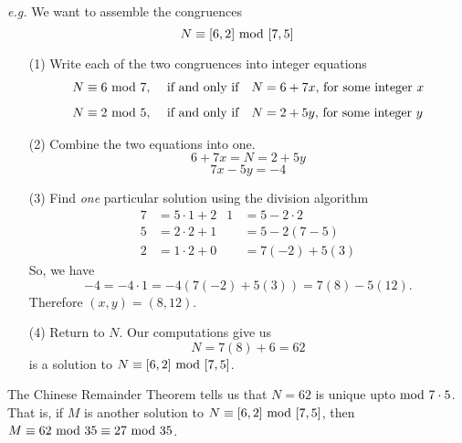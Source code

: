 \emph{e.g.} We want to assemble the congruences
\[N \equiv [6,2]\text{ mod }{[7,5]}\]
\begin{itemize}[leftmargin=2em]
\item[(1)] Write each of the two congruences into integer equations
\begin{align*}
N \equiv 6\text{ mod }{7},\quad &\text{ if and only if}\quad N = 6 + 7x \text{,\ for some integer $x$}\\[0.5em]
N \equiv 2\text{ mod }{5},\quad &\text{ if and only if}\quad N = 2 + 5y \text{,\ for some integer $y$}
\end{align*}
\item[(2)] Combine the two equations into one.
\[6 + 7x = N = 2 + 5y\]
\[7x - 5y = -4\]
\item[(3)] Find \emph{one} particular solution using the division algorithm
\begin{align*}
7 &= 5\cdot 1 + 2 & 1 &= 5 - 2\cdot 2\\[0.5em]
5 &= 2\cdot 2 + 1 & &= 5 - 2(7-5)\\[0.5em]
2 &= 1\cdot 2 + 0 & &= 7(-2) + 5(3)
\end{align*}
So, we have
\[-4 = -4\cdot 1 = -4(7(-2) + 5(3)) = 7(8) - 5(12).\]
Therefore $(x,y) = (8,12)$.
\item[(4)] Return to $N$. Our computations give us
\[N = 7(8) + 6 = 62\]
is a solution to $N \equiv [6,2]\text{ mod }{[7,5]}$.
\end{itemize}
The Chinese Remainder Theorem tells us that $N = 62$ is unique upto$\text{ mod }{7\cdot 5}$. That is, if $M$ is another solution to $N \equiv [6,2]\text{ mod }{[7,5]}$, then $M \equiv 62\text{ mod }{35} \equiv 27\text{ mod }{35}$.

\vspace*{1.5em}

